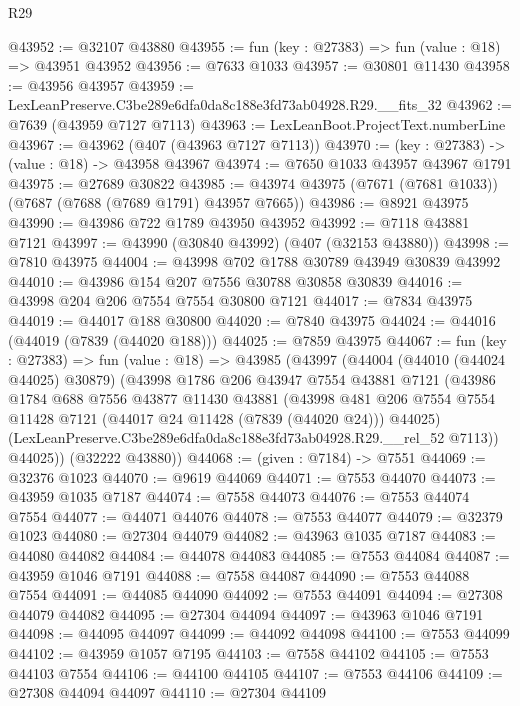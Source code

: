 \begin{lexlean}{R29}
\begin{coremodule}
@43952 := @32107 @43880
@43955 := fun (key : @27383) => fun (value : @18) => @43951 @43952
@43956 := @7633 @1033
@43957 := @30801 @11430
@43958 := @43956 @43957
@43959 := LexLeanPreserve.C3be289e6dfa0da8c188e3fd73ab04928.R29.__fits_32
@43962 := @7639 (@43959 @7127 @7113)
@43963 := LexLeanBoot.ProjectText.numberLine
@43967 := @43962 (@407 (@43963 @7127 @7113))
@43970 := (key : @27383) -> (value : @18) -> @43958 @43967
@43974 := @7650 @1033 @43957 @43967 @1791
@43975 := @27689 @30822
@43985 := @43974 @43975 (@7671 (@7681 @1033)) (@7687 (@7688 (@7689 @1791) @43957 @7665))
@43986 := @8921 @43975
@43990 := @43986 @722 @1789 @43950 @43952
@43992 := @7118 @43881 @7121
@43997 := @43990 (@30840 @43992) (@407 (@32153 @43880))
@43998 := @7810 @43975
@44004 := @43998 @702 @1788 @30789 @43949 @30839 @43992
@44010 := @43986 @154 @207 @7556 @30788 @30858 @30839
@44016 := @43998 @204 @206 @7554 @7554 @30800 @7121
@44017 := @7834 @43975
@44019 := @44017 @188 @30800
@44020 := @7840 @43975
@44024 := @44016 (@44019 (@7839 (@44020 @188)))
@44025 := @7859 @43975
@44067 := fun (key : @27383) =>
  fun (value : @18) =>
  @43985
    (@43997
      (@44004
        (@44010 (@44024 @44025) @30879)
        (@43998
          @1786
          @206
          @43947
          @7554
          @43881
          @7121
          (@43986
            @1784
            @688
            @7556
            @43877
            @11430
            @43881
            (@43998
              @481
              @206
              @7554
              @7554
              @11428
              @7121
              (@44017 @24 @11428 (@7839 (@44020 @24)))
              @44025)
            (LexLeanPreserve.C3be289e6dfa0da8c188e3fd73ab04928.R29.__rel_52 @7113))
          @44025))
      (@32222 @43880))
@44068 := (given : @7184) -> @7551
@44069 := @32376 @1023
@44070 := @9619 @44069
@44071 := @7553 @44070
@44073 := @43959 @1035 @7187
@44074 := @7558 @44073
@44076 := @7553 @44074 @7554
@44077 := @44071 @44076
@44078 := @7553 @44077
@44079 := @32379 @1023
@44080 := @27304 @44079
@44082 := @43963 @1035 @7187
@44083 := @44080 @44082
@44084 := @44078 @44083
@44085 := @7553 @44084
@44087 := @43959 @1046 @7191
@44088 := @7558 @44087
@44090 := @7553 @44088 @7554
@44091 := @44085 @44090
@44092 := @7553 @44091
@44094 := @27308 @44079 @44082
@44095 := @27304 @44094
@44097 := @43963 @1046 @7191
@44098 := @44095 @44097
@44099 := @44092 @44098
@44100 := @7553 @44099
@44102 := @43959 @1057 @7195
@44103 := @7558 @44102
@44105 := @7553 @44103 @7554
@44106 := @44100 @44105
@44107 := @7553 @44106
@44109 := @27308 @44094 @44097
@44110 := @27304 @44109

\end{coremodule}
\end{lexlean}
